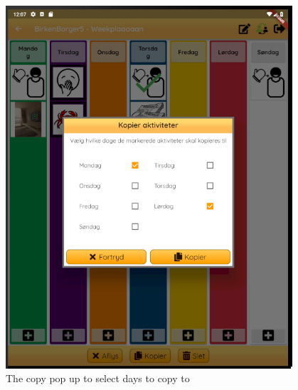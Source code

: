 \begin{figure}[H]
    \begin{center}
        \includegraphics[width=0.95\textwidth]{figures/FinalScreen/editWeekplanScreenCopy.png}
    \end{center}
    \caption{The copy pop up to select days to copy to}
    \label{fig:finalWeekplanScreenCopy}
\end{figure}
